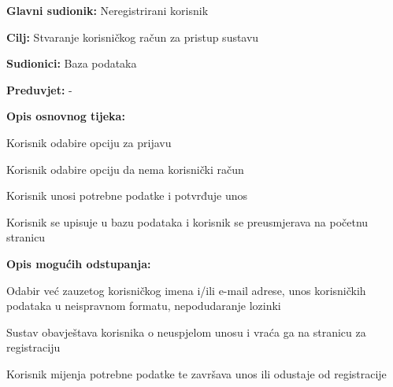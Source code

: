 \noindent {}
\begin{packed_item}

	\item \textbf{Glavni sudionik: }Neregistrirani korisnik
	\item  \textbf{Cilj:} Stvaranje korisničkog račun za pristup sustavu
	\item  \textbf{Sudionici:} Baza podataka
	\item  \textbf{Preduvjet:} -
	\item  \textbf{Opis osnovnog tijeka:}

	\item[] \begin{packed_enum}

		\item Korisnik odabire opciju za prijavu
		\item Korisnik odabire opciju da nema korisnički račun
		\item Korisnik unosi potrebne podatke i potvrđuje unos
		\item Korisnik se upisuje u bazu podataka i korisnik se preusmjerava na početnu stranicu
	\end{packed_enum}

	\item  \textbf{Opis mogućih odstupanja:}

	\item[] \begin{packed_item}

		\item[3.a] Odabir već zauzetog korisničkog imena i/ili e-mail adrese, unos korisničkih podataka u neispravnom formatu, nepodudaranje lozinki
		\item[] \begin{packed_enum}

			\item Sustav obavještava korisnika o neuspjelom unosu i vraća ga na stranicu za registraciju
			\item Korisnik mijenja potrebne podatke te završava unos ili odustaje od registracije

		\end{packed_enum}
	\end{packed_item}
\end{packed_item}

